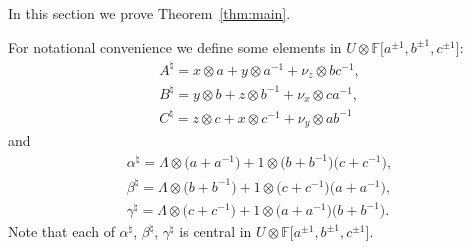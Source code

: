 \documentclass[pdftex]{sigma}
\numberwithin{equation}{section}
\begin{document}
In this section we prove Theorem~\ref{thm:main}.

For notational convenience we def\/ine some elements in
$U \otimes
\mathbb F \lbrack a^{\pm 1}, b^{\pm 1}, c^{\pm 1}\rbrack$:
\begin{gather}
A^\natural  =  x \otimes a + y \otimes a^{-1} + \nu_z \otimes bc^{-1},
\label{eq:aform}
\\
B^\natural  =  y \otimes b + z \otimes b^{-1} + \nu_x \otimes ca^{-1},
\label{eq:bform}
\\
C^\natural  =  z \otimes c + x \otimes c^{-1} + \nu_y \otimes ab^{-1}
\label{eq:cform}
\end{gather}
and
\begin{gather}
\alpha^\natural
 =
\Lambda \otimes \big(a+a^{-1}\big) + 1 \otimes \big(b+b^{-1}\big)\big(c+c^{-1}\big),
\label{eq:amaincom1}
\\
\beta^\natural  =
\Lambda \otimes \big(b+b^{-1}\big) + 1 \otimes \big(c+c^{-1}\big)(a+a^{-1}\big),
\label{eq:bmaincom2}
\\
\gamma^\natural
 =
\Lambda \otimes \big(c+c^{-1}\big) + 1 \otimes \big(a+a^{-1}\big)\big(b+b^{-1}\big).
\label{eq:cmaincom3}
\end{gather}
Note that each of $\alpha^\natural$, $\beta^\natural$, $\gamma^\natural$ is
central in
$U \otimes
\mathbb F \lbrack a^{\pm 1}, b^{\pm 1}, c^{\pm 1}\rbrack$.
\end{document}
